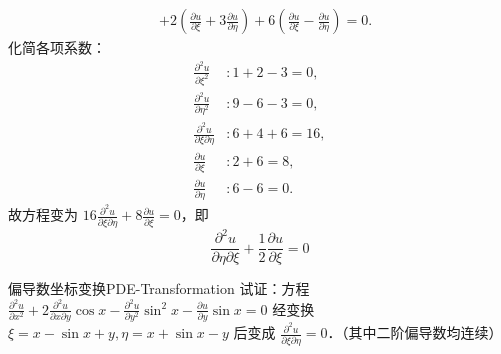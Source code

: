 \begin{myproof}
\begin{equation}
\begin{aligned}
             & + 2 \left( \frac{\partial u}{\partial \xi} + 3 \frac{\partial u}{\partial \eta} \right) + 6 \left( \frac{\partial u}{\partial \xi} - \frac{\partial u}{\partial \eta} \right) = 0.
        \end{aligned}
    \end{equation}
    化简各项系数：
    \begin{equation}
        \begin{aligned}
            \frac{\partial^2 u}{\partial \xi^2}             & : 1 + 2 - 3 = 0,  \\
            \frac{\partial^2 u}{\partial \eta^2}            & : 9 - 6 - 3 = 0,  \\
            \frac{\partial^2 u}{\partial \xi \partial \eta} & : 6 + 4 + 6 = 16, \\
            \frac{\partial u}{\partial \xi}                 & : 2 + 6 = 8,      \\
            \frac{\partial u}{\partial \eta}                & : 6 - 6 = 0.
        \end{aligned}
    \end{equation}
    故方程变为 $16 \frac{\partial^2 u}{\partial \xi \partial \eta} + 8 \frac{\partial u}{\partial \xi} = 0$，即
    \begin{equation}
        \boxed{\frac{\partial^2 u}{\partial \eta \partial \xi} + \frac{1}{2} \frac{\partial u}{\partial \xi} = 0}
    \end{equation}
\end{myproof}


\begin{problem}{偏导数坐标变换}{PDE-Transformation}
    试证：方程 $\frac{\partial^2 u}{\partial x^2} + 2 \frac{\partial^2 u}{\partial x \partial y} \cos x - \frac{\partial^2 u}{\partial y^2} \sin^2 x - \frac{\partial u}{\partial y} \sin x = 0$ 经变换 $\xi = x - \sin x + y, \eta = x + \sin x - y$ 后变成 $\frac{\partial^2 u}{\partial \xi \partial \eta} = 0$．（其中二阶偏导数均连续）
\end{problem}

